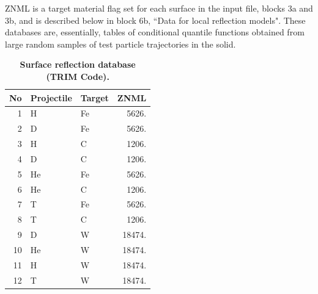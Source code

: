 ZNML is a target material flag set for each surface in the input file, blocks
3a and 3b, and is described below in block 6b, ``Data for local reflection
models".
These databases are, essentially, tables of conditional quantile functions
obtained from large random samples of test particle trajectories in the solid.
\begin{table}[h]
  \caption{\textbf{Surface reflection database (TRIM Code).}}
  \label{tabref}
  \begin{center}
    \begin{tabular}{|r|l|l|r|}
      \hline
      \textbf{No} & \textbf{Projectile} & \textbf{Target}
                  & \textbf{ZNML}
      \\ \hline \hline

      1           & H                   & Fe              & 5626.  \\ \hline

      2           & D                   & Fe              & 5626.  \\ \hline

      3           & H                   & C               & 1206.  \\ \hline

      4           & D                   & C               & 1206.  \\ \hline

      5           & He                  & Fe              & 5626.  \\ \hline

      6           & He                  & C               & 1206.  \\ \hline

      7           & T                   & Fe              & 5626.  \\ \hline

      8           & T                   & C               & 1206.  \\ \hline

      9           & D                   & W               & 18474. \\ \hline

      10          & He                  & W               & 18474. \\ \hline

      11          & H                   & W               & 18474. \\ \hline

      12          & T                   & W               & 18474. \\
      \hline\hline


\end{tabular}
\end{center}
\end{table}
